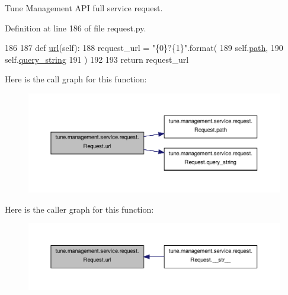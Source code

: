 Tune Management A\-P\-I full service request. 



Definition at line 186 of file request.\-py.


\begin{DoxyCode}
186 
187     \textcolor{keyword}{def }\hyperlink{classtune_1_1management_1_1service_1_1request_1_1Request_a4842aa40cbc1e2df7f33cb0febfd33df}{url}(self):
188         request\_url = \textcolor{stringliteral}{"\{0\}?\{1\}"}.format(
189                     self.\hyperlink{classtune_1_1management_1_1service_1_1request_1_1Request_a7a10f1e3cf3559c4a4bc0449c8aedc23}{path},
190                     self.\hyperlink{classtune_1_1management_1_1service_1_1request_1_1Request_adfe1bde13c0956896cac9925bd20d723}{query\_string}
191                 )
192 
193         \textcolor{keywordflow}{return} request\_url

\end{DoxyCode}


Here is the call graph for this function\-:
\nopagebreak
\begin{figure}[H]
\begin{center}
\leavevmode
\includegraphics[width=350pt]{classtune_1_1management_1_1service_1_1request_1_1Request_a4842aa40cbc1e2df7f33cb0febfd33df_cgraph}
\end{center}
\end{figure}




Here is the caller graph for this function\-:
\nopagebreak
\begin{figure}[H]
\begin{center}
\leavevmode
\includegraphics[width=350pt]{classtune_1_1management_1_1service_1_1request_1_1Request_a4842aa40cbc1e2df7f33cb0febfd33df_icgraph}
\end{center}
\end{figure}


